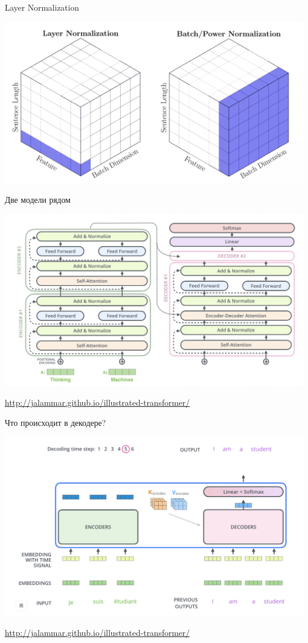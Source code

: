 \documentclass[notes,12pt, aspectratio=169]{beamer}
\begin{document}
\begin{frame}{Layer Normalization} 
	\begin{center}
		\includegraphics[width=.8\linewidth]{layer.png}
	\end{center}
\end{frame}


\begin{frame}{Две модели рядом} 
	\begin{center}
		\includegraphics[width=.8\linewidth]{enc_dec.png}
	\end{center}
	\vfill
	\footnotesize
	{\color{blue} \url{http://jalammar.github.io/illustrated-transformer/}}
\end{frame}



\begin{frame}{Что происходит в декодере?} 
	\begin{center}
		\includegraphics[width=.8\linewidth]{decoder.png}
	\end{center}
	\vfill
	\footnotesize
	{\color{blue} \url{http://jalammar.github.io/illustrated-transformer/}}
\end{frame}
\end{document}

